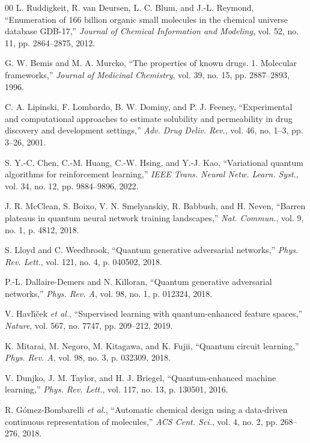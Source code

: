 \documentclass[conference]{IEEEtran}
\begin{document}
\begin{thebibliography}{00}
 L. Ruddigkeit, R. van Deursen, L. C. Blum, and J.-L. Reymond, ``Enumeration of 166 billion organic small molecules in the chemical universe database GDB-17,'' \textit{Journal of Chemical Information and Modeling}, vol. 52, no. 11, pp. 2864--2875, 2012.

 G. W. Bemis and M. A. Murcko, ``The properties of known drugs. 1. Molecular frameworks,'' \textit{Journal of Medicinal Chemistry}, vol. 39, no. 15, pp. 2887--2893, 1996.

 C. A. Lipinski, F. Lombardo, B. W. Dominy, and P. J. Feeney, ``Experimental and computational approaches to estimate solubility and permeability in drug discovery and development settings,'' \textit{Adv. Drug Deliv. Rev.}, vol. 46, no. 1--3, pp. 3--26, 2001.

 S. Y.-C. Chen, C.-M. Huang, C.-W. Hsing, and Y.-J. Kao, ``Variational quantum algorithms for reinforcement learning,'' \textit{IEEE Trans. Neural Netw. Learn. Syst.}, vol. 34, no. 12, pp. 9884--9896, 2022.

 J. R. McClean, S. Boixo, V. N. Smelyanskiy, R. Babbush, and H. Neven, ``Barren plateaus in quantum neural network training landscapes,'' \textit{Nat. Commun.}, vol. 9, no. 1, p. 4812, 2018.

 S. Lloyd and C. Weedbrook, ``Quantum generative adversarial networks,'' \textit{Phys. Rev. Lett.}, vol. 121, no. 4, p. 040502, 2018.

 P.-L. Dallaire-Demers and N. Killoran, ``Quantum generative adversarial networks,'' \textit{Phys. Rev. A}, vol. 98, no. 1, p. 012324, 2018.

 V. Havl{\'\i}{\v{c}}ek \textit{et al.}, ``Supervised learning with quantum-enhanced feature spaces,'' \textit{Nature}, vol. 567, no. 7747, pp. 209--212, 2019.

 K. Mitarai, M. Negoro, M. Kitagawa, and K. Fujii, ``Quantum circuit learning,'' \textit{Phys. Rev. A}, vol. 98, no. 3, p. 032309, 2018.

 V. Dunjko, J. M. Taylor, and H. J. Briegel, ``Quantum-enhanced machine learning,'' \textit{Phys. Rev. Lett.}, vol. 117, no. 13, p. 130501, 2016.

 R. G{\'o}mez-Bombarelli \textit{et al.}, ``Automatic chemical design using a data-driven continuous representation of molecules,'' \textit{ACS Cent. Sci.}, vol. 4, no. 2, pp. 268--276, 2018.
\end{thebibliography}
\end{document}
